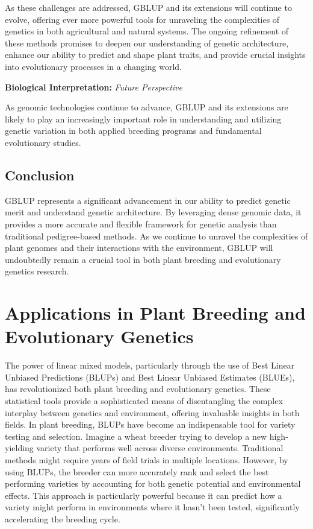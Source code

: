 \documentclass[12pt,a4paper]{article}
\newenvironment{interpretation}[1][]
{\begin{basebox}[linecolor=uqgreen]
\textbf{\color{uqgreen}Biological Interpretation:} \textit{#1}\par\noindent\ignorespaces}
{\end{basebox}}
\begin{document}
As these challenges are addressed, GBLUP and its extensions will continue to evolve, offering ever more powerful tools for unraveling the complexities of genetics in both agricultural and natural systems. The ongoing refinement of these methods promises to deepen our understanding of genetic architecture, enhance our ability to predict and shape plant traits, and provide crucial insights into evolutionary processes in a changing world.

\begin{interpretation}[Future Perspective]
As genomic technologies continue to advance, GBLUP and its extensions are likely to play an increasingly important role in understanding and utilizing genetic variation in both applied breeding programs and fundamental evolutionary studies.
\end{interpretation}

\subsection{Conclusion}

GBLUP represents a significant advancement in our ability to predict genetic merit and understand genetic architecture. By leveraging dense genomic data, it provides a more accurate and flexible framework for genetic analysis than traditional pedigree-based methods. As we continue to unravel the complexities of plant genomes and their interactions with the environment, GBLUP will undoubtedly remain a crucial tool in both plant breeding and evolutionary genetics research.

\section{Applications in Plant Breeding and Evolutionary Genetics}

The power of linear mixed models, particularly through the use of Best Linear Unbiased Predictions (BLUPs) and Best Linear Unbiased Estimates (BLUEs), has revolutionized both plant breeding and evolutionary genetics. These statistical tools provide a sophisticated means of disentangling the complex interplay between genetics and environment, offering invaluable insights in both fields. In plant breeding, BLUPs have become an indispensable tool for variety testing and selection. Imagine a wheat breeder trying to develop a new high-yielding variety that performs well across diverse environments. Traditional methods might require years of field trials in multiple locations. However, by using BLUPs, the breeder can more accurately rank and select the best performing varieties by accounting for both genetic potential and environmental effects. This approach is particularly powerful because it can predict how a variety might perform in environments where it hasn't been tested, significantly accelerating the breeding cycle.
\end{document}
